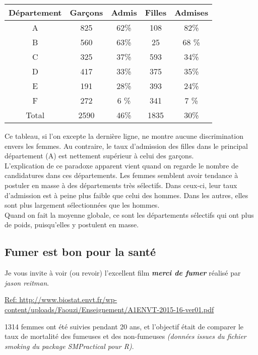 \documentclass[10pt,dvipsnames, dvips, svgnames]{article}
\begin{document}
\begin{center}
\begin{tabular}[]{|c |c |c |c |c |}
\hline Département & Garçons & Admis & Filles & Admises \\
\hline A & 825 & 62\% & 108 & 82\% \\
\hline B & 560 & 63\% & 25  & 68 \% \\
\hline C & 325 & 37\% & 593 & 34\% \\
\hline D & 417 & 33\% & 375 & 35\% \\
\hline E & 191 & 28\% & 393 & 24\% \\
\hline F & 272 & 6 \% & 341 & 7 \% \\
\hline Total & 2590 & 46\% & 1835 & 30\% \\
\hline  
\end{tabular} 
\end{center}

Ce tableau, si l'on excepte la dernière ligne, ne montre aucune discrimination envers les femmes. Au contraire, le taux d'admission des filles dans le principal département (A) est nettement supérieur à celui des garçons.\\
L'explication de ce paradoxe apparent vient quand on regarde le nombre de candidatures dans ces départements. Les femmes semblent avoir tendance à postuler en masse à des départements très sélectifs. Dans ceux-ci, leur taux d'admission est à peine plus faible que celui des hommes. Dans les autres, elles sont plus largement sélectionnées que les hommes.\\
Quand on fait la moyenne globale, ce sont les départements sélectifs qui ont plus de poids, puisqu'elles y postulent en masse.

\subsection{Fumer est bon pour la santé}

Je vous invite à voir (ou revoir) l'excellent  film  \textit{\textbf{merci de fumer}}  réalisé par \textit{jason reitman}.
\medskip

\href{http://www.biostat.envt.fr/wp-content/uploads/Faouzi/Enseignement/A1ENVT-2015-16-ver01.pdf}{Ref: http://www.biostat.envt.fr/wp-content/uploads/Faouzi/Enseignement/A1ENVT-2015-16-ver01.pdf}




1314 femmes ont été suivies pendant 20 ans, et l'objectif était de comparer le taux de mortalité des fumeuses et des non-fumeuses  \textit{(données issues du fichier smoking du package SMPractical pour R)}.
\end{document}
